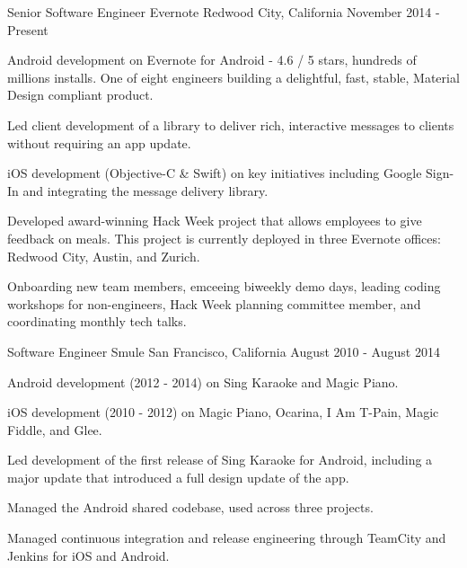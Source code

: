 

\begin{cventries}

  \cventry
    {Senior Software Engineer} %
    {Evernote} %
    {Redwood City, California} %
    {November 2014 - Present} %
    {
      \begin{cvitems} %
        \item {Android development on Evernote for Android - 4.6 / 5 stars, hundreds of millions installs. One of eight engineers building a delightful, fast, stable, Material Design compliant product.}
        \item {Led client development of a library to deliver rich, interactive messages to clients without requiring an app update.}
        \item {iOS development (Objective-C \& Swift) on key initiatives including Google Sign-In and integrating the message delivery library.}
        \item {Developed award-winning Hack Week project that allows employees to give feedback on meals. This project is currently deployed in three Evernote offices: Redwood City, Austin, and Zurich.}
		\item {Onboarding new team members, emceeing biweekly demo days, leading coding workshops for non-engineers, Hack Week planning committee member, and coordinating monthly tech talks.}
      \end{cvitems}
    }
    
  \cventry
    {Software Engineer} %
    {Smule} %
    {San Francisco, California} %
    {August 2010 - August 2014} %
    {
      \begin{cvitems} %
        \item {Android development (2012 - 2014) on Sing Karaoke and Magic Piano.}
        \item {iOS development (2010 - 2012) on Magic Piano, Ocarina, I Am T-Pain, Magic Fiddle, and Glee.}
        \item {Led development of the first release of Sing Karaoke for Android, including a major update that introduced a full design update of the app.}
        \item {Managed the Android shared codebase, used across three projects.}
        \item {Managed continuous integration and release engineering through TeamCity and Jenkins for iOS and Android.}
      \end{cvitems}
    }
    

\end{cventries}
